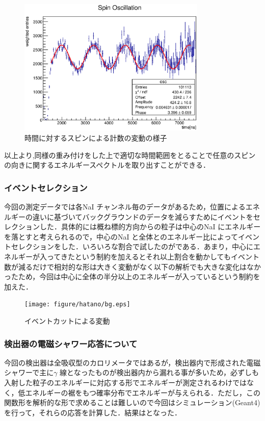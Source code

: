 \begin{figure}[bht]
\centering
\includegraphics[width=0.8\textwidth]{figure/hatano/oscillation.eps}
\caption{時間に対するスピンによる計数の変動の様子}
\label{hatano_fig:oscillation}
\end{figure}

以上より,同様の重み付けをした上で適切な時間範囲をとることで任意のスピンの向きに関するエネルギースペクトルを取り出すことができる．

\subsubsection{イベントセレクション}
今回の測定データでは各NaI チャンネル毎のデータがあるため，位置によるエネルギーの違いに基づいてバックグラウンドのデータを減らすためにイベントをセレクションした．具体的には概ね標的方向からの粒子は中心のNaI にエネルギーを落とすと考えられるので，中心のNaI と全体とのエネルギー比によってイベントセレクションをした．いろいろな割合で試したのがである．あまり，中心にエネルギーが入ってきたという制約を加えるとそれ以上割合を動かしてもイベント数が減るだけで相対的な形は大きく変動がなく以下の解析でも大きな変化はなかったため，今回は中心に全体の半分以上のエネルギーが入っているという制約を加えた．

\begin{figure}[bht]
\centering
\texttt{[image: figure/hatano/bg.eps]}
\caption{イベントカットによる変動}
\label{hatano_fig:bg}
\end{figure}

\subsubsection{検出器の電磁シャワー応答について}
今回の検出器は全吸収型のカロリメータではあるが，検出器内で形成された電磁シャワーで主に$\gamma$ 線となったものが検出器内から漏れる事が多いため，必ずしも入射した粒子のエネルギーに対応する形でエネルギーが測定されるわけではなく，低エネルギーの裾をもつ確率分布でエネルギーが与えられる．ただし，この関数形を解析的な形で求めることは難しいので今回はシミュレーション(Geant4)を行って，それらの応答を計算した．結果はとなった．

